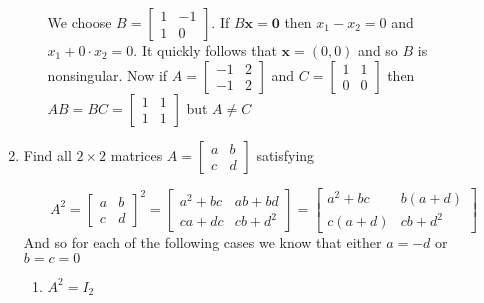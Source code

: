 \documentclass[letterpaper]{article}
\begin{document}
\begin{enumerate}
\begin{enumerate}
  We choose $B=\left[\begin{array}{cc}1&-1\\1&0\end{array}\right]$. If $B\mathbf{x}=\mathbf{0}$ then $x_1-x_2=0$ and $x_1+0\cdot x_2=0$. It quickly follows that $\mathbf{x}=(0,0)$ and so $B$ is nonsingular. Now if $A=\left[\begin{array}{cc}-1&2\\-1&2\end{array}\right]$ and $C=\left[\begin{array}{cc}1&1\\0&0\end{array}\right]$ then $AB=BC=\left[\begin{array}{cc}1&1\\1&1\end{array}\right]$ but $A\ne C$
  \end{enumerate}
\item
Find all $2\times 2$ matrices $A=\left[\begin{array}{cc}a&b\\c&d\end{array}\right]$ satisfying

\[
  A^2=\left[\begin{array}{cc}a&b\\c&d\end{array}\right]^2
  =\left[\begin{array}{cc}a^2+bc&ab+bd\\ca+dc&cb+d^2\end{array}\right]
  =\left[\begin{array}{cc}a^2+bc&b(a+d)\\c(a+d)&cb+d^2\end{array}\right]
\]
And so for each of the following cases we know that either $a=-d$ or $b=c=0$
  \begin{enumerate}
  \item
  $A^2=I_2$


\end{enumerate}
\end{enumerate}
\end{document}
